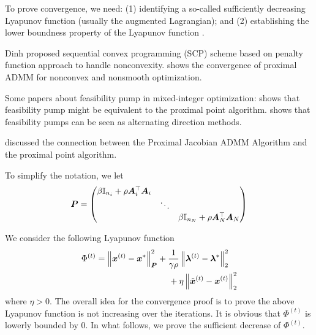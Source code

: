 \documentclass[twocolumn,amsthm]{autart}%
\theoremstyle{definition}
\theoremstyle{plain}
\begin{document}
To prove convergence, we need: (1) identifying a so-called sufficiently decreasing Lyapunov function (usually the augmented Lagrangian); and
(2) establishing the lower boundness property of the Lyapunov
function \cite{yang2022proximal}.

Dinh \etal \cite{dinh2013dual} proposed sequential convex programming (SCP) scheme based on penalty function approach to handle nonconvexity.
\cite{yang2022proximal} shows the convergence of proximal ADMM for nonconvex and nonsmooth optimization.

Some papers about feasibility pump in mixed-integer optimization: \cite{boland2012new} shows that feasibility pump might be equivalent to the proximal point algorithm.
\cite{geissler2017penalty} shows that feasibility pumps can be seen as alternating direction methods.

\cite[Section V]{deng2017parallel} discussed the connection between the Proximal Jacobian ADMM Algorithm and the proximal point algorithm.


To simplify the notation, we let
\begin{equation}
\boldsymbol{P} = 
\begin{pmatrix}
\beta \mathbb{I}_{n_i} + \rho \boldsymbol{A}_i^\top \boldsymbol{A}_i \\
& \ddots \\
& & \beta \mathbb{I}_{n_N} + \rho \boldsymbol{A}_N^\top \boldsymbol{A}_N
\end{pmatrix}
\end{equation}

We consider the following Lyapunov function
\begin{equation}
\begin{multlined}
\Phi^{(t)} = \norm{\bbsym{x}^{(t)}-\bbsym{x}^{*}}^2_{\bbsym{P}}
+ \frac{1}{\gamma \rho} \norm{\bbsym{\lambda}^{(t)}-\bbsym{\lambda}^{*}}_2^2 \\
+ \eta \norm{\xtil^{(t)} - \bbsym{x}^{(t)}}_2^2
\end{multlined}
\end{equation}
where $\eta > 0$.
The overall idea for the convergence proof is to prove the above Lyapunov function is not increasing over the iterations.
It is obvious that $\Phi^{(t)}$ is lowerly bounded by $0$.
In what follows, we prove the sufficient decrease of $\Phi^{(t)}$.
\end{document}
